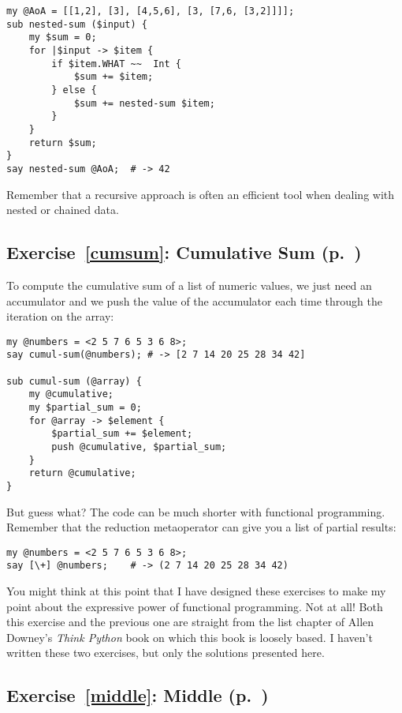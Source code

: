 \begin{verbatim}
my @AoA = [[1,2], [3], [4,5,6], [3, [7,6, [3,2]]]];
sub nested-sum ($input) { 
    my $sum = 0; 
    for |$input -> $item { 
        if $item.WHAT ~~  Int {
            $sum += $item;
        } else {
            $sum += nested-sum $item;
        }
    } 
    return $sum;
}
say nested-sum @AoA;  # -> 42
\end{verbatim}

Remember that a recursive approach is often an efficient 
tool when dealing with nested or chained data. 

\subsection{Exercise~\ref{cumsum}: Cumulative Sum (p.~\pageref{cumsum})}
\label{sol_cumsum}

To compute the cumulative sum of a list of numeric values, 
we just need an accumulator and we push the value of 
the accumulator each time through the iteration 
on the array:

\begin{verbatim}
my @numbers = <2 5 7 6 5 3 6 8>;
say cumul-sum(@numbers); # -> [2 7 14 20 25 28 34 42]

sub cumul-sum (@array) {
    my @cumulative;
    my $partial_sum = 0;
    for @array -> $element {
        $partial_sum += $element;
        push @cumulative, $partial_sum;
    }
    return @cumulative;
}
\end{verbatim}

But guess what? The code can be much shorter with 
functional programming. Remember that the reduction 
metaoperator can give you a list of partial results:

\begin{verbatim}
my @numbers = <2 5 7 6 5 3 6 8>;
say [\+] @numbers;    # -> (2 7 14 20 25 28 34 42)
\end{verbatim}

You might think at this point that I have designed these 
exercises to make my point about the expressive power 
of functional programming. Not at all! Both this 
exercise and the previous one are straight from 
the list chapter of Allen Downey's \emph{Think Python} 
book on which this book is loosely based. 
I haven't written these two exercises, but only the 
solutions presented here.


\subsection{Exercise~\ref{middle}: Middle (p.~\pageref{middle})}
\label{sol_middle}

